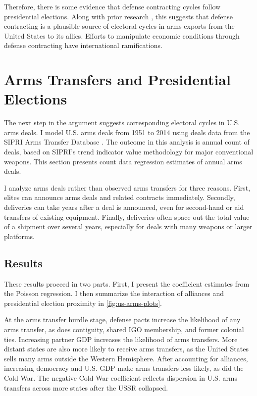 \documentclass[12pt]{article}
\begin{document}
Therefore, there is some evidence that defense contracting cycles follow presidential elections.
Along with prior research \citep{DerouenHeo2000}, this suggests that defense contracting is a plausible source of electoral cycles in arms exports from the United States to its allies.
Efforts to manipulate economic conditions through defense contracting have international ramifications. 


\section{Arms Transfers and Presidential Elections}


The next step in the argument suggests corresponding electoral cycles in U.S. arms deals. 
I model U.S. arms deals from 1951 to 2014 using deals data from the SIPRI Arms Transfer Database \citep{SIPRI2021}.
The outcome in this analysis is annual count of deals, based on SIPRI's trend indicator value methodology for major conventional weapons.
This section presents count data regression estimates of annual arms deals. 

I analyze arms deals rather than observed arms transfers for three reasons.
First, elites can announce arms deals and related contracts immediately. 
Secondly, deliveries can take years after a deal is announced, even for second-hand or aid transfers of existing equipment. 
Finally, deliveries often space out the total value of a shipment over several years, especially for deals with many weapons or larger platforms. 




\subsection{Results}


These results proceed in two parts.
First, I present the coefficient estimates from the Poisson regression. 
I then summarize the interaction of alliances and presidential election proximity in \autoref{fig:us-arms-plots}.


At the arms transfer hurdle stage, defense pacts increase the likelihood of any arms transfer, as does contiguity, shared IGO membership, and former colonial ties.
Increasing partner GDP increases the likelihood of arms transfers.
More distant states are also more likely to receive arms transfers, as the United States sells many arms outside the Western Hemisphere. 
After accounting for alliances, increasing democracy and U.S. GDP make arms transfers less likely, as did the Cold War. 
The negative Cold War coefficient reflects dispersion in U.S. arms transfers across more states after the USSR collapsed.
\end{document}
